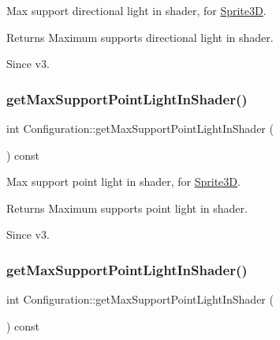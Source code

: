 Max support directional light in shader, for \hyperlink{classSprite3D}{Sprite3D}.

\begin{DoxyReturn}{Returns}
Maximum supports directional light in shader. 
\end{DoxyReturn}
\begin{DoxySince}{Since}
v3. 
\end{DoxySince}
\mbox{\label{classConfiguration_ab26f93b21e2d51d7b343068b15252f1b}} 
\subsubsection{\texorpdfstring{get\+Max\+Support\+Point\+Light\+In\+Shader()}{getMaxSupportPointLightInShader()}\hspace{0.1cm}{\footnotesize\ttfamily [1/2]}}
{\footnotesize\ttfamily int Configuration\+::get\+Max\+Support\+Point\+Light\+In\+Shader (\begin{DoxyParamCaption}{ }\end{DoxyParamCaption}) const}

Max support point light in shader, for \hyperlink{classSprite3D}{Sprite3D}.

\begin{DoxyReturn}{Returns}
Maximum supports point light in shader. 
\end{DoxyReturn}
\begin{DoxySince}{Since}
v3. 
\end{DoxySince}
\mbox{\label{classConfiguration_ab26f93b21e2d51d7b343068b15252f1b}} 
\subsubsection{\texorpdfstring{get\+Max\+Support\+Point\+Light\+In\+Shader()}{getMaxSupportPointLightInShader()}\hspace{0.1cm}{\footnotesize\ttfamily [2/2]}}
{\footnotesize\ttfamily int Configuration\+::get\+Max\+Support\+Point\+Light\+In\+Shader (\begin{DoxyParamCaption}{ }\end{DoxyParamCaption}) const}

